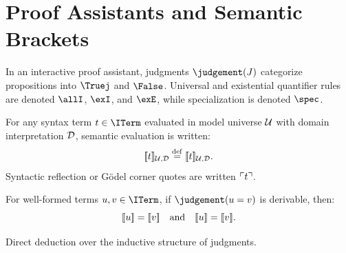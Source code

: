 \section{Proof Assistants and Semantic Brackets}

\begin{definition}
In an interactive proof assistant, judgments $\judgement(J)$ categorize propositions into $\Truej$ and $\False$. Universal and existential quantifier rules are denoted $\allI$, $\exI$, and $\exE$, while specialization is denoted $\spec$.
\end{definition}

\begin{definition}
For any syntax term $t \in \ITerm$ evaluated in model universe $\mathcal{U}$ with domain interpretation $\mathcal{D}$, semantic evaluation is written:
\[
[\![ t ]\!]_{\mathcal{U}, \mathcal{D}} \stackrel{\mathrm{def}}{=} [\![ t ]\!]_{\mathcal{U}, \mathcal{D}}.
\]
Syntactic reflection or Gödel corner quotes are written $\ulcorner t \urcorner$.
\end{definition}

\begin{theorem}
For well-formed terms $u, v \in \ITerm$, if $\judgement(u = v)$ is derivable, then:
\[
\sem{u} = \sem{v} \quad \text{and} \quad \llbrack u \rrbrack = \llbrack v \rrbrack.
\]
\end{theorem}

\myprf
Direct deduction over the inductive structure of judgments.
\myqed
